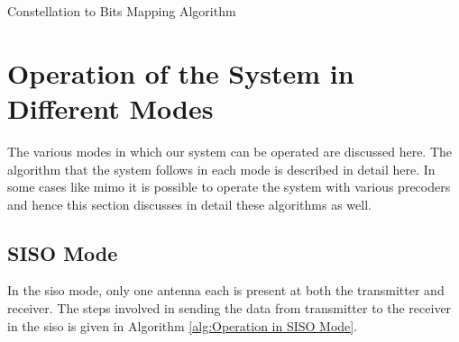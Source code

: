 \begin{algorithm}[!htbp]
\caption{Constellation to Bits Mapping Algorithm}
\label{alg:Working of Demodulator}
\begin{algorithmic}
		\ELSE
		\ENDIF
		\ENDWHILE
	\ENDIF
\ENDWHILE
\end{algorithmic}
\end{algorithm} 



\section{Operation of the System in Different Modes}
The various modes in which our system can be operated are discussed here. The algorithm that the system follows in each mode is described in detail here. In some cases like \acrshort{mimo} it is possible to operate the system with various precoders and hence this section discusses in detail these algorithms as well.

\subsection{SISO Mode}
In the \acrlong{siso} mode, only one antenna each is present at both the transmitter and receiver. The steps involved in sending the data from transmitter to the receiver in the \acrshort{siso} is given in Algorithm \ref{alg:Operation in SISO Mode}.

